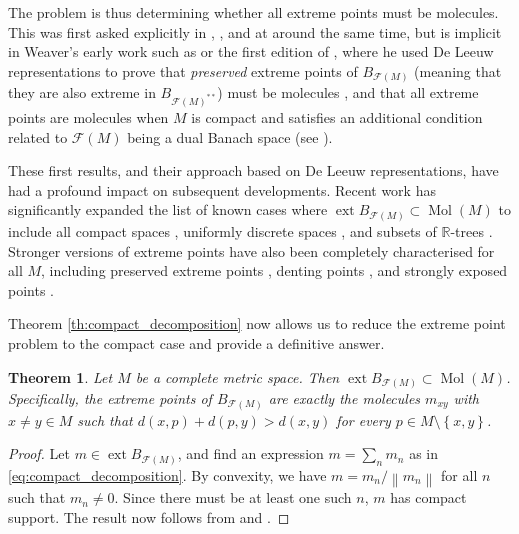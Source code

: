 \documentclass[a4paper,10pt]{amsart}
\DeclareMathOperator{\ext}{ext}                             %
\newcommand{\RR}{\mathbb{R}}                                %
\newcommand{\set}[1]{\left\{{#1}\right\}}                   %
\newcommand{\norm}[1]{\left\|{#1}\right\|}                  %
\newcommand{\lipfree}[1]{\mathcal{F}({#1})}                 %
\DeclareMathOperator{\Mol}{Mol}                              %
\theoremstyle{plain}
\newtheorem{theorem}{Theorem}[section]
\theoremstyle{definition}
\theoremstyle{remark}
\begin{document}
The problem is thus determining whether all extreme points must be molecules. This was first asked explicitly in \cite[Question 2]{AliagaGuirao}, \cite[p. 2]{GPPR}, and \cite[p. 102]{Weaver2} at around the same time, but is implicit in Weaver's early work such as \cite{Weaver95} or the first edition of \cite{Weaver2}, where he used De Leeuw representations to prove that \emph{preserved} extreme points of $B_{\lipfree{M}}$ (meaning that they are also extreme in $B_{\lipfree{M}^{**}}$) must be molecules \cite[Corollary 3.44]{Weaver2}, and that all extreme points are molecules when $M$ is compact and satisfies an additional condition related to $\lipfree{M}$ being a dual Banach space (see \cite[Corollary 4.41]{Weaver2}).

These first results, and their approach based on De Leeuw representations, have had a profound impact on subsequent developments. Recent work has significantly expanded the list of known cases where $\ext B_{\lipfree{M}} \subset \Mol(M)$ to include all compact spaces \cite{Aliaga}, uniformly discrete spaces \cite{APS1}, and subsets of $\RR$-trees \cite{APP}. Stronger versions of extreme points have also been completely characterised for all $M$, including preserved extreme points \cite{AliagaGuirao}, denting points \cite{GPPR}, and strongly exposed points \cite{GPAZ}.

Theorem \ref{th:compact_decomposition} now allows us to reduce the extreme point problem to the compact case and provide a definitive answer.



\begin{theorem}\label{th:extreme}
Let $M$ be a complete metric space. Then $\ext B_{\lipfree{M}} \subset \Mol(M)$. Specifically, the extreme points of $B_{\lipfree{M}}$ are exactly the molecules $m_{xy}$ with $x\neq y\in M$ such that $d(x,p)+d(p,y)>d(x,y)$ for every $p\in M\setminus\set{x,y}$.
\end{theorem}

\begin{proof}
Let $m\in\ext B_{\lipfree{M}}$, and find an expression $m=\sum_n m_n$ as in \eqref{eq:compact_decomposition}. By convexity, we have $m=m_n/\norm{m_n}$ for all $n$ such that $m_n\neq 0$. Since there must be at least one such $n$, $m$ has compact support. The result now follows from \cite[Corollary 12]{Aliaga} and \cite[Theorem 1.1]{AP_rmi}.
\end{proof}
\end{document}
